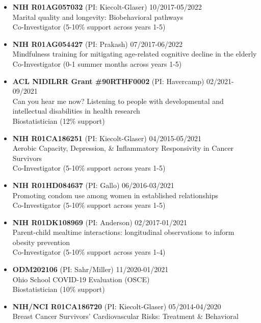 \documentclass[
  english,
  letterpaper,
  DIV=11,
  numbers=noendperiod]{scrartcl}
\begin{document}
\begin{itemize}
  Initiation of injectable contraception immediately postpartum among
  breastfeeding women\\
  Co-Investigator (5-10\% support across years 1-4)
\item
  \textbf{NIH R01AG057032} (PI: Kiecolt-Glaser) {10/2017-05/2022}\\
  Marital quality and longevity: Biobehavioral pathways\\
  Co-Investigator (5-10\% support across years 1-5)
\item
  \textbf{NIH R01AG054427} (PI: Prakash) {07/2017-06/2022}\\
  Mindfulness training for mitigating age-related cognitive decline in
  the elderly\\
  Co-Investigator (0-1 summer months across years 1-5)
\item
  \textbf{ACL NIDILRR Grant \#90RTHF0002} (PI: Havercamp)
  {02/2021-09/2021}\\
  Can you hear me now? Listening to people with developmental and
  intellectual disabilities in health research\\
  Biostatistician (12\% support)
\item
  \textbf{NIH R01CA186251} (PI: Kiecolt-Glaser) {04/2015-05/2021}\\
  Aerobic Capacity, Depression, \& Inflammatory Responsivity in Cancer
  Survivors\\
  Co-Investigator (5-10\% support across years 1-5)
\item
  \textbf{NIH R01HD084637} (PI: Gallo) {06/2016-03/2021}\\
  Promoting condom use among women in established relationships\\
  Co-Investigator (5-10\% support across years 1-5)
\item
  \textbf{NIH R01DK108969} (PI: Anderson) {02/2017-01/2021}\\
  Parent-child mealtime interactions: longitudinal observations to
  inform obesity prevention\\
  Co-Investigator (5-10\% support across years 1-4)
\item
  \textbf{ODM202106} (PI: Sahr/Miller) {11/2020-01/2021}\\
  Ohio School COVID-19 Evaluation (OSCE)\\
  Biostatistician (10\% support)
\item
  \textbf{NIH/NCI R01CA186720} (PI: Kiecolt-Glaser) {05/2014-04/2020}\\
  Breast Cancer Survivors' Cardiovascular Risks: Treatment \& Behavioral

\end{itemize}
\end{document}
